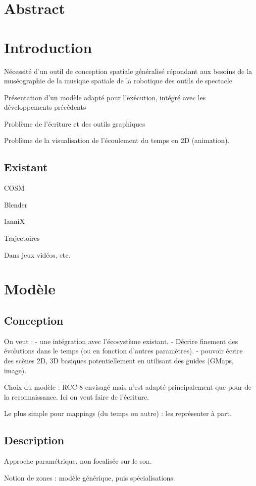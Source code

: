 \documentclass[french]{article}
\begin{document}
\section*{Abstract}
\section{Introduction}
Nécessité d'un outil de conception spatiale généralisé répondant aux besoins de la muséographie
de la musique spatiale
de la robotique
des outils de spectacle

Présentation d'un modèle adapté pour l'exécution, intégré avec les développements précédents

Problème de l'écriture et des outils graphiques

Problème de la visualisation de l'écoulement du temps en 2D (animation).

\subsection{Existant}

COSM

Blender

IanniX

Trajectoires

Dans jeux vidéos, etc.

\section{Modèle}
\subsection{Conception}
On veut : 
- une intégration avec l'écosystème existant.
- Décrire finement des évolutions dans le temps (ou en fonction d'autres paramètres).
- pouvoir écrire des scènes 2D, 3D basiques potentiellement en utilisant des guides (GMaps, image).


Choix du modèle : 
RCC-8 envisagé mais n'est adapté principalement que pour de la reconnaissance.
Ici on veut faire de l'écriture.

Le plus simple pour mappings (du temps ou autre) : les représenter à part.

\subsection{Description}
Approche paramétrique, non focalisée sur le son.

Notion de zones : modèle générique, puis spécialisations.
\end{document}
